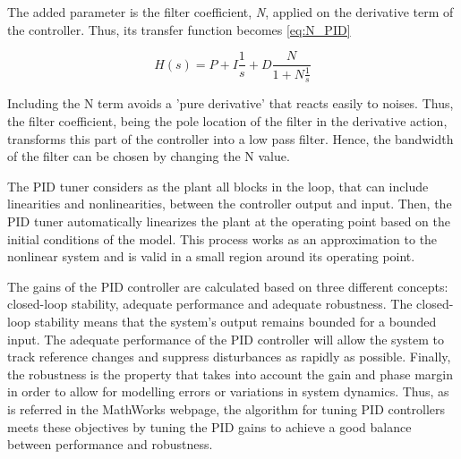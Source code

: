 The added parameter is the filter coefficient, \textit{N}, applied on the derivative term of the controller. Thus, its transfer function becomes \ref{eq:N_PID}

\begin{equation}\label{eq:N_PID}
H(s) = P + I\frac{1}{s} + D\frac{N}{1+N\frac{1}{s}}
\end{equation}

Including the N term avoids a 'pure derivative' that reacts easily to noises. Thus, the filter coefficient, being the pole location of the filter in the derivative action, transforms this part of the controller into a low pass filter. Hence, the bandwidth of the filter can be chosen by changing the N value.\par

\vspace{5mm}


The PID tuner considers as the plant all blocks in the loop, that can include linearities and nonlinearities, between the controller output and input. Then, the PID tuner automatically linearizes the plant at the operating point based on the initial conditions of the model. This process works as an approximation to the nonlinear system and is valid in a small region around its operating point.\par

The gains of the PID controller are calculated based on three different concepts: closed-loop stability, adequate performance and adequate robustness. The closed-loop stability means that the system’s output remains bounded for a bounded input. The adequate performance of the PID controller will allow the system to track reference changes and suppress disturbances as rapidly as possible. Finally, the robustness is the property that takes into account the gain and phase margin in order to allow for modelling errors or variations in system dynamics. Thus, as is referred in the MathWorks webpage, the algorithm for tuning PID controllers meets these objectives by tuning the PID gains to achieve a good balance between performance and robustness.



